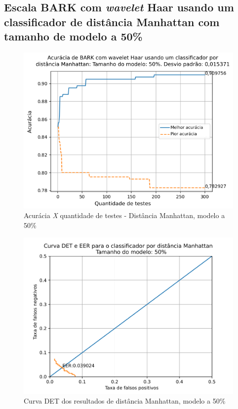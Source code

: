 			\FloatBarrier
		\subsection{Escala BARK com \textit{wavelet} Haar usando um classificador de distância Manhattan com tamanho de modelo a 50\%}
		
			
			
			\begin{figure}[ht]
				\centering
				\includegraphics[width=\linewidth]{images/results/confusionMatrices/classifier_Manhattan_50.png}
				\caption{Acurácia \textit{X} quantidade de testes - Distância Manhattan, modelo a 50\%}
				\label{fig:classifiermanhattan50}
			\end{figure}
	
			\begin{figure}[!ht]
				\centering
				\includegraphics[width=.9\linewidth]{images/results/det/DET_for_classifier_Manhattan_50}
				\caption{Curva DET dos resultados de distância Manhattan, modelo a 50\%}
				\label{fig:detforclassifiermanhattan50}
			\end{figure}
		
